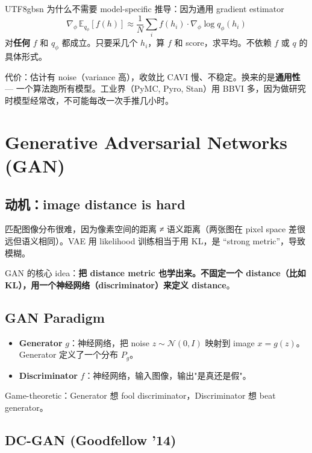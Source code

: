 \documentclass[11pt]{article}
\begin{document}
\begin{CJK}{UTF8}{gbsn}
为什么不需要 model-specific 推导：因为通用 gradient estimator
\[
  \nabla_\phi\, \mathbb{E}_{q_\phi}[f(h)] \approx \frac{1}{N}\sum_i f(h_i) \cdot \nabla_\phi \log q_\phi(h_i)
\]
对\textbf{任何} $f$ 和 $q_\phi$ 都成立。只要采几个 $h_i$，算 $f$ 和 score，求平均。不依赖 $f$ 或 $q$ 的具体形式。

代价：估计有 noise（variance 高），收敛比 CAVI 慢、不稳定。换来的是\textbf{通用性} --- 一个算法跑所有模型。工业界（PyMC, Pyro, Stan）用 BBVI 多，因为做研究时模型经常改，不可能每改一次手推几小时。

\section{Generative Adversarial Networks (GAN)}

\subsection{动机：image distance is hard}

匹配图像分布很难，因为像素空间的距离 ≠ 语义距离（两张图在 pixel space 差很远但语义相同）。VAE 用 likelihood 训练相当于用 KL，是 ``strong metric''，导致模糊。

GAN 的核心 idea：\textbf{把 distance metric 也学出来。不固定一个 distance（比如 KL），用一个神经网络（discriminator）来定义 distance}。

\subsection{GAN Paradigm}

\begin{itemize}
  \item \textbf{Generator} $g$：神经网络，把 noise $z \sim \mathcal{N}(0, I)$ 映射到 image $x = g(z)$。Generator 定义了一个分布 $P_g$。
  \item \textbf{Discriminator} $f$：神经网络，输入图像，输出"是真还是假"。
\end{itemize}

Game-theoretic：Generator 想 fool discriminator，Discriminator 想 beat generator。

\subsection{DC-GAN (Goodfellow '14)}


\end{CJK}
\end{document}
